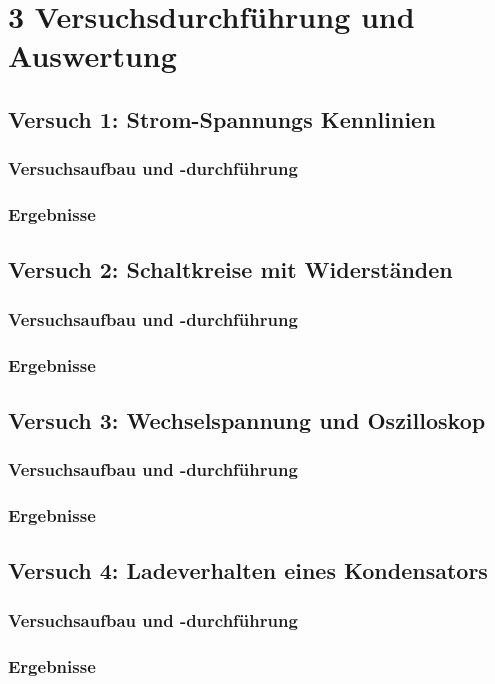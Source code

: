 \chapter*{3 Versuchsdurchführung und Auswertung}
\setcounter{chapter}{3}
\setcounter{section}{0}
\setcounter{subsection}{0}

\section{Versuch 1: Strom-Spannungs Kennlinien}

    \subsection{Versuchsaufbau und -durchführung}

    \subsection{Ergebnisse}

\section{Versuch 2: Schaltkreise mit Widerständen}

    \subsection{Versuchsaufbau und -durchführung}

    \subsection{Ergebnisse}

\section{Versuch 3: Wechselspannung und Oszilloskop}

    \subsection{Versuchsaufbau und -durchführung}

    \subsection{Ergebnisse}

\section{Versuch 4: Ladeverhalten eines Kondensators}

    \subsection{Versuchsaufbau und -durchführung}

    \subsection{Ergebnisse}
